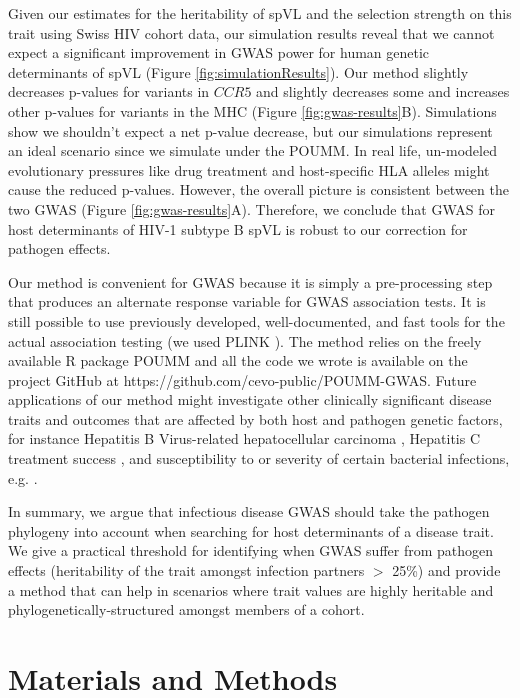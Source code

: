 \documentclass[11pt]{article}
\begin{document}
\begin{linenumbers}
Given our estimates for the heritability of spVL and the selection strength on this trait using Swiss HIV cohort data, our simulation results reveal that we cannot expect a significant improvement in GWAS power for human genetic determinants of spVL (Figure \ref{fig:simulationResults}). Our method slightly decreases p-values for variants in $CCR5$ and slightly decreases some and increases other p-values for variants in the MHC (Figure \ref{fig:gwas-results}B). Simulations show we shouldn't expect a net p-value decrease, but our simulations represent an ideal scenario since we simulate under the POUMM. In real life, un-modeled evolutionary pressures like drug treatment and host-specific HLA alleles might cause the reduced p-values. However, the overall picture is consistent between the two GWAS (Figure \ref{fig:gwas-results}A). Therefore, we conclude that GWAS for host determinants of HIV-1 subtype B spVL is robust to our correction for pathogen effects. 

Our method is convenient for GWAS because it is simply a pre-processing step that produces an alternate response variable for GWAS association tests. It is still possible to use previously developed, well-documented, and fast tools for the actual association testing (we used PLINK \citep{Chang2015}). The method relies on the freely available R package POUMM \citep{Mitov2017a-POUMM} and all the code we wrote is available on the project GitHub at https://github.com/cevo-public/POUMM-GWAS. Future applications of our method might investigate other clinically significant disease traits and outcomes that are affected by both host and pathogen genetic factors, for instance Hepatitis B Virus-related hepatocellular carcinoma \citep{An2018HostCarcinoma}, Hepatitis C treatment success \citep{Ansari2017Genome-to-genomeVirus}, and susceptibility to or severity of certain bacterial infections, e.g. \cite{Messina2016ImpactInfections, Donnenberg2015BacterialStudies}.

In summary, we argue that infectious disease GWAS should take the pathogen phylogeny into account when searching for host determinants of a disease trait. We give a practical threshold for identifying when GWAS suffer from pathogen effects (heritability of the trait amongst infection partners $>$ 25\%) and provide a method that can help in scenarios where trait values are highly heritable and phylogenetically-structured amongst members of a cohort.

\section*{Materials and Methods}


\end{linenumbers}
\end{document}
